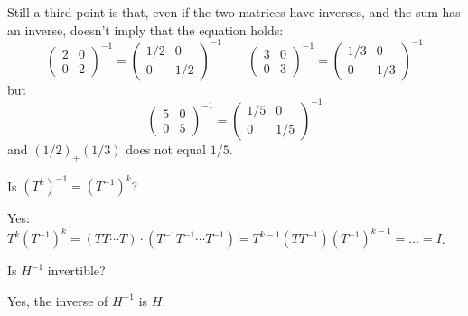\begin{exercises}
\begin{answer}
\begin{exparts}
          Still a third point is that, even if the two matrices have inverses,
          and the sum has an inverse, doesn't imply that the equation holds:
          \begin{equation*}
            \begin{pmatrix}
              2  &0  \\
              0  &2
            \end{pmatrix}^{-1}
            =\begin{pmatrix}
              1/2  &0  \\
              0    &1/2
            \end{pmatrix}^{-1}
            \qquad
            \begin{pmatrix}
              3  &0  \\
              0  &3
            \end{pmatrix}^{-1}
            =\begin{pmatrix}
              1/3  &0  \\
              0    &1/3
            \end{pmatrix}^{-1}
          \end{equation*}
          but
          \begin{equation*}
            \begin{pmatrix}
              5  &0  \\
              0  &5
            \end{pmatrix}^{-1}
            =\begin{pmatrix}
              1/5  &0  \\
              0    &1/5
            \end{pmatrix}^{-1}
          \end{equation*}
          and $(1/2)_+(1/3)$ does not equal $1/5$.
      \end{exparts}  
    \end{answer}
  \recommended \item 
    Is \( (T^k)^{-1}=(T^{-1})^k \)?
    \begin{answer}
      Yes:
      \( T^k(T^{-1})^k=(TT\cdots T)\cdot (T^{-1}T^{-1}\cdots T^{-1})
         =T^{k-1}(TT^{-1})(T^{-1})^{k-1}=\dots=I \). 
    \end{answer}
  \item 
    Is \( H^{-1} \) invertible?
    \begin{answer}
       Yes, the inverse of \( H^{-1} \) is \( H \).  
    \end{answer}
  \item 

\end{exercises}
